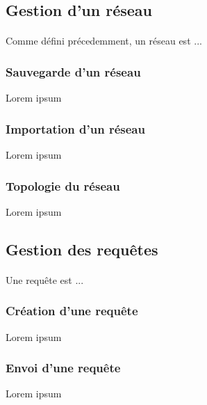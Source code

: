 \documentclass[12pt]{article}
\begin{document}


\subsection{Gestion d'un réseau}

\paragraph{} Comme défini précedemment, un réseau est ...

\subsubsection{Sauvegarde d'un réseau}
Lorem ipsum

\subsubsection{Importation d'un réseau}
Lorem ipsum

\subsubsection{Topologie du réseau}
Lorem ipsum


\subsection{Gestion des requêtes}

\paragraph{} Une requête est ...

\subsubsection{Création d'une requête}
Lorem ipsum

\subsubsection{Envoi d'une requête}
Lorem ipsum
\end{document}
